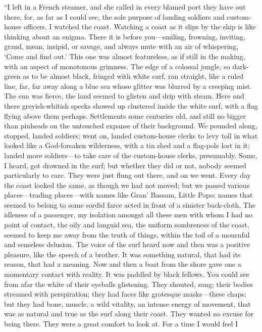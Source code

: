 \documentclass[12pt]{report}
\begin{document}
``I left in a French steamer, and she called in every blamed port they
have out there, for, as far as I could see, the sole purpose of landing
soldiers and custom-house officers. I watched the coast. Watching a
coast as it slips by the ship is like thinking about an enigma. There it
is before you---smiling, frowning, inviting, grand, mean, insipid, or
savage, and always mute with an air of whispering, `Come and find out.'
This one was almost featureless, as if still in the making, with an
aspect of monotonous grimness. The edge of a colossal jungle, so
dark-green as to be almost black, fringed with white surf, ran straight,
like a ruled line, far, far away along a blue sea whose glitter was
blurred by a creeping mist. The sun was fierce, the land seemed to
glisten and drip with steam. Here and there greyish-whitish specks
showed up clustered inside the white surf, with a flag flying above them
perhaps. Settlements some centuries old, and still no bigger than
pinheads on the untouched expanse of their background. We pounded along,
stopped, landed soldiers; went on, landed custom-house clerks to levy
toll in what looked like a God-forsaken wilderness, with a tin shed and
a flag-pole lost in it; landed more soldiers---to take care of the
custom-house clerks, presumably. Some, I heard, got drowned in the surf;
but whether they did or not, nobody seemed particularly to care. They
were just flung out there, and on we went. Every day the coast looked
the same, as though we had not moved; but we passed various
places---trading places---with names like Gran' Bassam, Little Popo;
names that seemed to belong to some sordid farce acted in front of a
sinister back-cloth. The idleness of a passenger, my isolation amongst
all these men with whom I had no point of contact, the oily and languid
sea, the uniform sombreness of the coast, seemed to keep me away from
the truth of things, within the toil of a mournful and senseless
delusion. The voice of the surf heard now and then was a positive
pleasure, like the speech of a brother. It was something natural, that
had its reason, that had a meaning. Now and then a boat from the shore
gave one a momentary contact with reality. It was paddled by black
fellows. You could see from afar the white of their eyeballs glistening.
They shouted, sang; their bodies streamed with perspiration; they had
faces like grotesque masks---these chaps; but they had bone, muscle, a
wild vitality, an intense energy of movement, that was as natural and
true as the surf along their coast. They wanted no excuse for being
there. They were a great comfort to look at. For a time I would feel I
\end{document}

